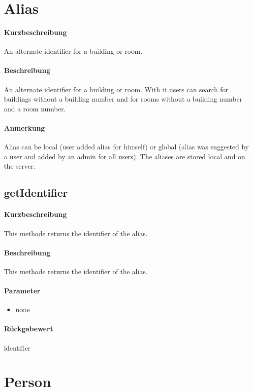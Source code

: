 \section{Alias}
\paragraph*{Kurzbeschreibung}
An alternate identifier for a building or room.
\paragraph*{Beschreibung}
An alternate identifier for a building or room. 
With it users can search for buildings without a building number and for rooms without a building number and a room number.
\paragraph*{Anmerkung}
Alias can be local (user added alias for himself) or global (alias was suggested by a user and added by an admin for all users).
The aliases are stored local and on the server.

\subsection{getIdentifier}%
\paragraph*{Kurzbeschreibung}
This methode returns the identifier of the alias.
\paragraph*{Beschreibung}
This methode returns the identifier of the alias.
\paragraph*{Parameter}
\begin{itemize}
    \item none
\end{itemize}
\paragraph*{Rückgabewert}
identifier


\section{Person}
